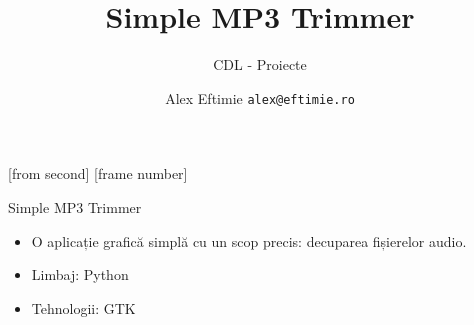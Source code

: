 \documentclass{beamer}
\title[SMT]{Simple MP3 Trimmer}
\subtitle{CDL - Proiecte}
\institute{ROSEdu}
\author{Alex Eftimie \texttt{alex@eftimie.ro}}
\begin{document}
[from second]
[frame number]

\frame{\titlepage}




\begin{frame}{Simple MP3 Trimmer}
\begin{itemize} %
\item O aplicație grafică simplă cu un scop precis: decuparea fișierelor audio.
\item Limbaj: Python
\item Tehnologii: GTK
\end{itemize}
\end{frame}
\end{document}
